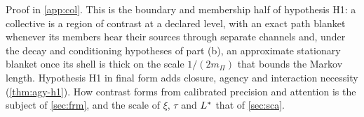 Proof in \cref{app:col}. This is the boundary and membership half of hypothesis H1: a collective is a region of contrast at a declared level, with an exact path blanket whenever its members hear their sources through separate channels and, under the decay and conditioning hypotheses of part (b), an approximate stationary blanket once its shell is thick on the scale $1/(2m_\Pi)$ that bounds the Markov length. Hypothesis H1 in final form adds closure, agency and interaction necessity (\cref{thm:agy-h1}). How contrast forms from calibrated precision and attention is the subject of \cref{sec:frm}, and the scale of $\xi$, $\tau$ and $L^{\ast}$ that of \cref{sec:sca}.
